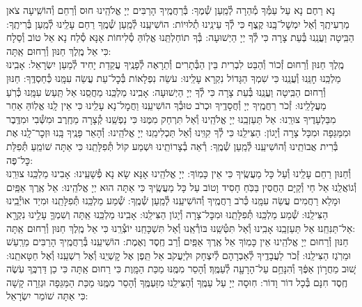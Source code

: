 \documentclass[twoside, openany, parskip=half, 11pt]{book}
\begin{document}
נָא רַחֶם נָא עַל עַמְּ֯ךָ מְ֯הֵרָה לְ֯מַֽעַן שְׁ֯מֶךָ: בְּ֯רַחֲמֶֽיךָ הָרַבִּים יְיָ אֱלֹהֵֽינוּ חוּס וְ֯רַחֵם וְ֯הוֹשִֽׁיעָה צֹאן מַרְעִיתֶֽךָ וְ֯אַל יִמְשׇׁל־בָּֽנוּ קֶֽצֶף כִּי לְ֯ךָ עֵינֵֽינוּ תְ֯לוּיוֹת: הוֹשִׁיעֵֽנוּ לְ֯מַֽעַן שְׁ֯מֶֽךָ רַחֵם עָלֵֽינוּ לְ֯מַֽעַן בְּ֯רִיתֶֽךָ: הַבִּֽיטָה וַעֲנֵֽנוּ בְּ֯עֵת צָרָה כִּי לְ֯ךָ יְיָ הַיְשׁוּעָה: בְּ֯ךָ תוֹחַלְתֵּֽנוּ אֱלֽוֹהַּ סְ֯לִיחוֹת אָנָּא סְ֯לַח נָא אֵל טוֹב וְ֯סַלָח כִּי אֵל מֶֽלֶךְ חַנּוּן וְ֯רַחוּם אַֽתָּה:\\
מֶֽלֶךְ חַנּוּן וְ֯רַחוּם זְ֯כוֹר וְ֯הַבֵּט לִבְרִית בֵּין הַבְּ֯תָרִים וְ֯תֵרָאֶה לְ֯פָנֶֽיךָ עֲקֵדַת יָחִיד לְ֯מַעַן יִשְׂרָאֵל: אָבִֽינוּ מַלְכֵּֽנוּ חׇנֵּֽנוּ וְ֯עֲנֵֽנוּ כִּי שִׁמְךָ הַגָּדוֹל נִקְרָא עָלֵֽינוּ: עֹשֵׂה נִפְלָאוֹת בְּ֯כׇל־עֵת עֲשֵׂה עִמָּֽנוּ כְּ֯חַסְדֶּֽךָ: חַנּוּן וְ֯רַחוּם הַבִּֽיטָה וַעֲנֵֽנוּ בְּ֯עֵת צָרָה כִּי לְ֯ךָ יְיָ הַיְשׁוּעָה: אָבִֽינוּ מַלְכֵּֽנוּ מַחֲסֵֽנוּ אַל תַּֽעַשׂ עִמָּֽנוּ כְּ֯רֹֽעַ מַעֲלָלֵֽינוּ: זְ֯כֹר רַחֲמֶֽיךָ יְיָ וְ֯חֲסָדֶֽיךָ וּכְרֹב טוּבְ֯ךָ הוֹשִׁיעֵֽנוּ וַחֲמׇל־נָא עָלֵֽינוּ כִּי אֵין לָֽנוּ אֱלֽוֹהַּ אַחֵר מִבַּלְעָדֶיךָ צוּרֵֽנוּ: אַל תַּעַזְבֵֽנוּ יְיָ אֱלֹהֵֽינוּ וְ֯אַל תִּרְחַק מִמֶּנּוּ כִּי נַפְשֵֽׁנוּ קְ֯צָרָה מֵחֶֽרֶב וּמִשְּׁ֯בִי וּמִדֶּֽבֶר וּמִמַּגֵּפָה וּמִכָּל צָרָה וְ֯יָגוֹן: הַצִּילֵֽנוּ כִּי לְ֯ךָ קִוִּֽינוּ וְ֯אַל תַּכְלִימֵֽנוּ יְיָ אֱלֹהֵֽינוּ: וְ֯הָאֵר פָּנֶֽיךָ בָּֽנוּ וּזְכׇר־לָֽנוּ אֶת בְּ֯רִית אֲבוֹתֵֽינוּ וְ֯הוֹשִׁיעֵֽנוּ לְ֯מַֽעַן שְׁ֯מֶֽךָ: רְ֯אֵה בְ֯צָרוֹתֵֽינוּ וּשְׁמַע קוֹל תְּ֯פִלָּתֵֽנוּ כִּי אַתָּה שׁוֹמֵֽעַ תְּ֯פִלַּת כׇּל־פֶּה:\\
וְ֯חַנּוּן רַחֵם עָלֵֽינוּ וְ֯עַל כָּל מַעֲשֶֽׂיךָ כִּי אֵין כָּמֽוֹךָ: יְיָ אֱלֹהֵֽינוּ אָנָּא שָׂא נָא פְ֯שָׁעֵֽינוּ: אָבִינוּ מַלְכֵּֽנוּ צוּרֵֽנוּ וְ֯גוֹאֲלֵֽנוּ אֵל חַי וְ֯קַיָּם הַחֲסִין בַּכֹּֽחַ חָסִיד וָטוֹב עַל כָּל מַעֲשֶֽׂיךָ כִּי אַתָּה הוּא יְיָ אֱלֹהֵֽינוּ: אֵל אֶֽרֶךְ אַפַּֽיִם וּמָלֵא רַחֲמִים עֲשֵׂה עִמָּֽנוּ כְּ֯רֹב רַחֲמֶֽיךָ וְ֯הוֹשִׁיעֵֽנוּ לְ֯מַֽעַן שְׁ֯מֶֽךָ: שְׁ֯מַע מַלְכֵּֽנוּ תְּ֯פִלָּתֵֽנוּ וּמִיַד אוֹיְ֯בֵֽינוּ הַצִּילֵֽנוּ: שְׁ֯מַע מַלְכֵּֽנוּ תְּ֯פִלָּתֵֽנוּ וּמִכׇּל־צָרָה וְ֯יָגוֹן הַצִּילֵֽנוּ: אָבִֽינוּ מַלְכֵּֽנוּ אַֽתָּה וְשִׁמְךָ֛ עָלֵ֥ינוּ נִקְרָ֖א אַל־תַּנִּחֵֽנוּ׃ אַל תַּעַזְבֵֽנוּ אָבִֽינוּ וְ֯אַל תִּטְּ֯שֵֽׁנוּ בּוֹרְ֯אֵֽנוּ וְ֯אַל תִּשְׁכָּחֵֽנוּ יוֹצְ֯רֵֽנוּ כִּי אֵל מֶֽלֶךְ חַנּוּן וְ֯רַחוּם אַֽתָּה:\\
חַנּוּן וְ֯רַחוּם יְיָ אֱלֹהֵֽינוּ אֵין כָּמֽוֹךָ אֵל אֶֽרֶךְ אַפַּֽיִם וְ֯רַב חֶֽסֶד וֶאֶמֶת: הוֹשִׁיעֵֽנוּ בְּ֯רַחֲמֶֽיךָ הָרַבִּים מֵרַֽעַשׁ וּמֵרֹֽגֶז הַצִּילֵֽנוּ: זְ֯כֹר לַעֲבָדֶֽיךָ לְ֯אַבְרָהָם לְ֯יִצְחָק וּלְיַעֲקֹב אַל תֵּֽפֶן אֶל קׇשְׁיֵֽנוּ וְ֯אֶל רִשְׁעֵֽנוּ וְ֯אֶל חַטָּאתֵֽנוּ:
שׁ֚וּב מֵחֲר֣וֹן אַפֶּ֔ךָ וְ֯הִנָּחֵ֥ם עַל־הָרָעָ֖ה לְ֯עַמֶּֽךָ׃ וְ֯הָסֵר מִמֶּֽנּוּ מַכַּת הַמָּֽוֶת כִּי רַחוּם אַֽתָּה כִּי כֵן דַּרְכֶּֽךָ עֹֽשֶׂה חֶֽסֶד חִנָּם בְּ֯כָל דוֹר וָדוֹר: חֽוּסָה יְיָ עַל עַמֶּֽךָ וְ֯הַצִּילֵֽנוּ מִזַּעְמֶּֽךָ וְ֯הָסֵר מִמֶּֽנּוּ מַכַּת הַמַּגֵּפָה וּגְזֵרָה קָשָׁה כִּי אַתָּה שׁוֹמֵר יִשְׂרָאֵל:
\end{document}
